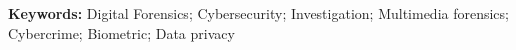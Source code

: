 \documentclass[12pt,a4paper]{article}
\begin{document}
\begin{justify}







\vspace{0.3cm}

\textbf{Keywords:} Digital Forensics; Cybersecurity; Investigation; Multimedia forensics; Cybercrime; Biometric; Data privacy

\end{justify}





\newpage

\tableofcontents

\newpage



\end{document}
